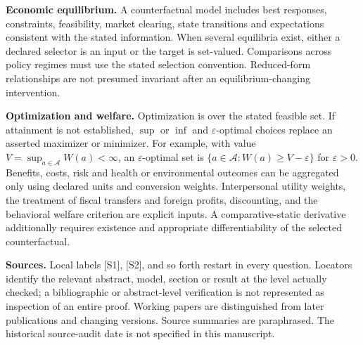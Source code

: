\documentclass[11pt,a4paper]{article}
\begin{document}
\textbf{Economic equilibrium.} A counterfactual model includes best responses, constraints, feasibility, market clearing, state transitions and expectations consistent with the stated information. When several equilibria exist, either a declared selector is an input or the target is set-valued. Comparisons across policy regimes must use the stated selection convention. Reduced-form relationships are not presumed invariant after an equilibrium-changing intervention.

\textbf{Optimization and welfare.} Optimization is over the stated feasible set. If attainment is not established, $\sup$ or $\inf$ and $\varepsilon$-optimal choices replace an asserted maximizer or minimizer. For example, with value $V=\sup_{a\in\mathcal A}W(a)<\infty$, an $\varepsilon$-optimal set is $\{a\in\mathcal A:W(a)\geq V-\varepsilon\}$ for $\varepsilon>0$. Benefits, costs, risk and health or environmental outcomes can be aggregated only using declared units and conversion weights. Interpersonal utility weights, the treatment of fiscal transfers and foreign profits, discounting, and the behavioral welfare criterion are explicit inputs. A comparative-static derivative additionally requires existence and appropriate differentiability of the selected counterfactual.

\textbf{Sources.} Local labels [S1], [S2], and so forth restart in every question. Locators identify the relevant abstract, model, section or result at the level actually checked; a bibliographic or abstract-level verification is not represented as inspection of an entire proof. Working papers are distinguished from later publications and changing versions. Source summaries are paraphrased. The historical source-audit date is not specified in this manuscript.
\end{document}
